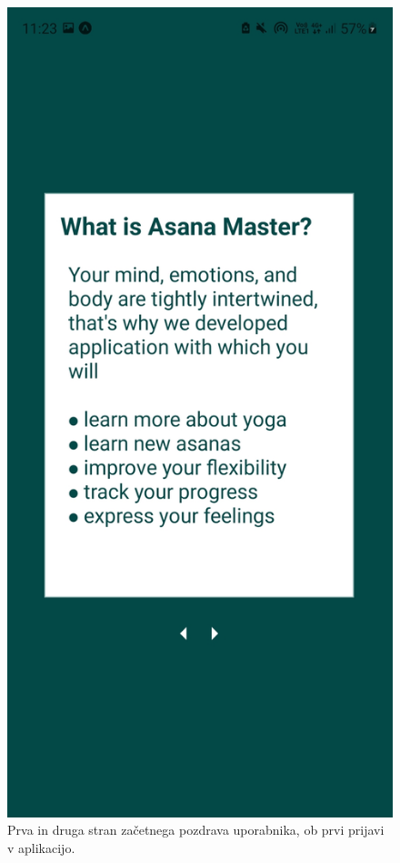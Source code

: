 \documentclass[a4paper, 12pt]{book}
\begin{document}
\begin{figure}[!tbp]
\begin{minipage}[b]{0.35\textwidth}
    \label{pozdrav}
  \end{minipage}
  \begin{minipage}[b]{0.35\textwidth}
    \includegraphics[width=\textwidth]{pozdrav2.jpg}\centering
  \end{minipage}
    \caption{Prva in druga stran začetnega pozdrava uporabnika, ob prvi prijavi v aplikacijo.}
\end{figure}
\end{document}
